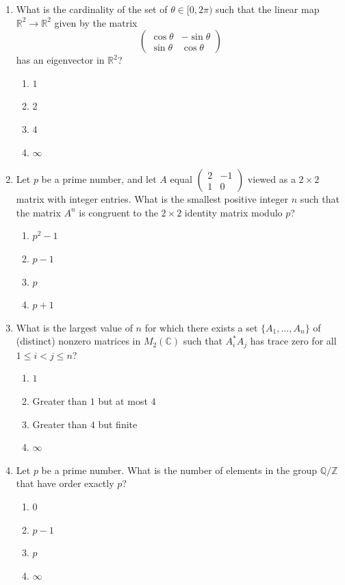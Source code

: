 \documentclass[11pt, a4paper]{article}
\begin{document}
\begin{enumerate}
  \item What is the cardinality of the set of $\theta \in [0, 2\pi)$ such that the linear map $\mathbb{R}^2 \to \mathbb{R}^2$ given by the matrix
  \[
    \begin{pmatrix} \cos\theta & -\sin\theta \\ \sin\theta & \cos\theta \end{pmatrix}
  \]
  has an eigenvector in $\mathbb{R}^2$?
  \begin{enumerate}[label=(\alph*)]
    \item $1$
    \item $2$
    \item $4$
    \item $\infty$
  \end{enumerate}

  \item Let $p$ be a prime number, and let $A$ equal $\begin{pmatrix} 2 & -1 \\ 1 & 0 \end{pmatrix}$ viewed as a $2 \times 2$ matrix with integer entries. What is the smallest positive integer $n$ such that the matrix $A^n$ is congruent to the $2 \times 2$ identity matrix modulo $p$?
  \begin{enumerate}[label=(\alph*)]
    \item $p^2 - 1$
    \item $p - 1$
    \item $p$
    \item $p + 1$
  \end{enumerate}

  \item What is the largest value of $n$ for which there exists a set $\{A_1, \dots, A_n\}$ of (distinct) nonzero matrices in $M_2(\mathbb{C})$ such that $A_i^* A_j$ has trace zero for all $1 \le i < j \le n$?
  \begin{enumerate}[label=(\alph*)]
    \item $1$
    \item Greater than $1$ but at most $4$
    \item Greater than $4$ but finite
    \item $\infty$
  \end{enumerate}

  \item Let $p$ be a prime number. What is the number of elements in the group $\mathbb{Q}/\mathbb{Z}$ that have order exactly $p$?
  \begin{enumerate}[label=(\alph*)]
    \item $0$
    \item $p - 1$
    \item $p$
    \item $\infty$
  \end{enumerate}


\end{enumerate}
\end{document}
